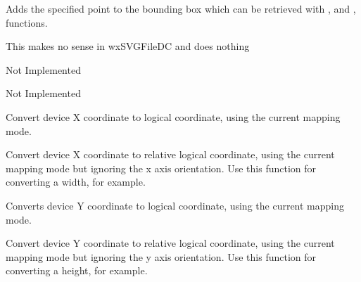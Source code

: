 \label{wxdccalcboundingbox}


Adds the specified point to the bounding box which can be retrieved with 
,  and 
,  functions.


\label{wxdcclear}


This makes no sense in wxSVGFileDC and does nothing


\label{wxdccrosshair}


Not Implemented

\label{wxdcdestroyclippingregion}


Not Implemented

\label{wxdcdevicetologicalx}


Convert device X coordinate to logical coordinate, using the current
mapping mode.

\label{wxdcdevicetologicalxrel}


Convert device X coordinate to relative logical coordinate, using the current
mapping mode but ignoring the x axis orientation.
Use this function for converting a width, for example.

\label{wxdcdevicetologicaly}


Converts device Y coordinate to logical coordinate, using the current
mapping mode.

\label{wxdcdevicetologicalyrel}


Convert device Y coordinate to relative logical coordinate, using the current
mapping mode but ignoring the y axis orientation.
Use this function for converting a height, for example.

